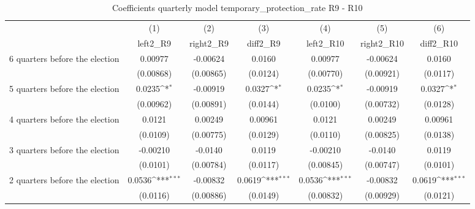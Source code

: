 \begin{table}[htbp]\centering
\def\sym#1{\ifmmode^{#1}\else\(^{#1}\)\fi}
\caption{Coefficients quarterly model temporary\_protection\_rate R9 - R10}
\begin{tabular}{l*{6}{c}}
\hline\hline
                    &\multicolumn{1}{c}{(1)}&\multicolumn{1}{c}{(2)}&\multicolumn{1}{c}{(3)}&\multicolumn{1}{c}{(4)}&\multicolumn{1}{c}{(5)}&\multicolumn{1}{c}{(6)}\\
                    &\multicolumn{1}{c}{left2\_R9}&\multicolumn{1}{c}{right2\_R9}&\multicolumn{1}{c}{diff2\_R9}&\multicolumn{1}{c}{left2\_R10}&\multicolumn{1}{c}{right2\_R10}&\multicolumn{1}{c}{diff2\_R10}\\
\hline
 6 quarters before the election&     0.00977         &    -0.00624         &      0.0160         &     0.00977         &    -0.00624         &      0.0160         \\
                    &   (0.00868)         &   (0.00865)         &    (0.0124)         &   (0.00770)         &   (0.00921)         &    (0.0117)         \\
[1em]
 5 quarters before the election&      0.0235\sym{*}  &    -0.00919         &      0.0327\sym{*}  &      0.0235\sym{*}  &    -0.00919         &      0.0327\sym{*}  \\
                    &   (0.00962)         &   (0.00891)         &    (0.0144)         &    (0.0100)         &   (0.00732)         &    (0.0128)         \\
[1em]
 4 quarters before the election&      0.0121         &     0.00249         &     0.00961         &      0.0121         &     0.00249         &     0.00961         \\
                    &    (0.0109)         &   (0.00775)         &    (0.0129)         &    (0.0110)         &   (0.00825)         &    (0.0138)         \\
[1em]
 3 quarters before the election&    -0.00210         &     -0.0140         &      0.0119         &    -0.00210         &     -0.0140         &      0.0119         \\
                    &    (0.0101)         &   (0.00784)         &    (0.0117)         &   (0.00845)         &   (0.00747)         &    (0.0101)         \\
[1em]
 2 quarters before the election&      0.0536\sym{***}&    -0.00832         &      0.0619\sym{***}&      0.0536\sym{***}&    -0.00832         &      0.0619\sym{***}\\
                    &    (0.0116)         &   (0.00886)         &    (0.0149)         &   (0.00832)         &   (0.00929)         &    (0.0121)         \\

\end{tabular}
\end{table}
